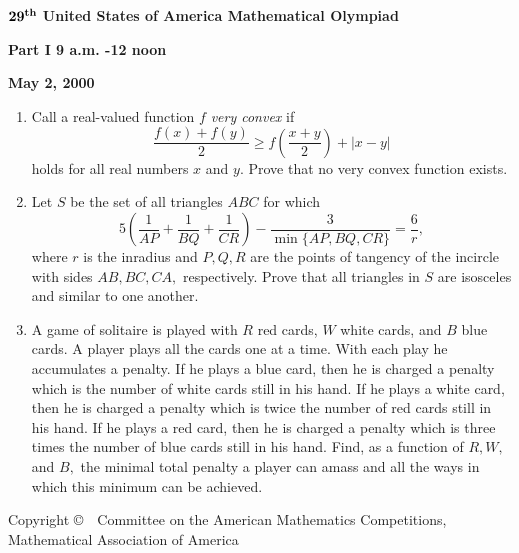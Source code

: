 \documentclass[12pt]{article}
\def\be{\begin{enumerate}}
\def\ee{\end{enumerate}}
\def\ii{\item}
\def\Lp{\left(}
\def\Rp{\right)}
\begin{document}
%

\begin{center}
${\bf 29^{th}}$ {\bf United States of America Mathematical Olympiad}
\end{center}



\begin{center}
{\bf  Part  I \hspace{ 6mm} 9 a.m. -12 noon}
\end{center}


\begin{center}
{\bf May 2, 2000}
\end{center}

\bigskip 


\be
\ii %
Call a real-valued function $f$ {\em very convex} if
\[
\frac{f(x) + f(y)}{2} \ge f\Lp \frac{x+y}{2} \Rp + |x-y|
\]
holds for all real numbers $x$ and $y$. Prove that no very convex function exists.
\vspace{5mm}

\ii %
Let $S$ be the set of all triangles $ABC$ for which
\[
5\Lp \frac{1}{AP} + \frac{1}{BQ} + \frac{1}{CR} \Rp - \frac{3}{\min\{ AP, BQ, CR \}} =
\frac{6}{r},
\]
where $r$ is the inradius and $P, Q, R$ are the points of tangency of the incircle with sides
$AB, BC, CA,$ respectively. Prove that all triangles in $S$ are isosceles and similar to one
another.
\vspace{5mm}

 
\ii %
A game of solitaire is played with $R$ red cards, $W$ white cards, and $B$ blue cards. A player
plays all the cards one at a time. With each play he accumulates a penalty. If he plays a blue
card, then he is charged a penalty which is the number of white cards still in his hand. If he
plays a white card, then he is charged a penalty which is twice the number of red cards still in
his hand. If he plays a red card, then he is charged a penalty which is three times the number of
blue cards still in his hand. Find, as a function of $R, W,$ and $B,$ the minimal total penalty
a player can amass and all the ways in which this minimum can be achieved.

\ee

\vspace{80 mm}

{\small
\begin{center}
Copyright \copyright \ \ Committee on the American  Mathematics  Competitions,\\
Mathematical Association of America
\end{center}
}
\newpage
\end{document}
